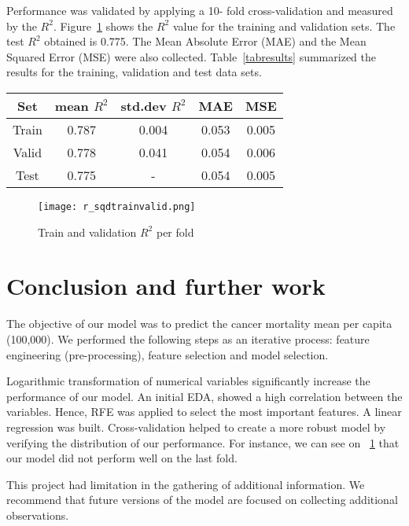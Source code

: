 \documentclass[twocolumn]{article}
\begin{document}
Performance was validated by applying a 10- fold cross-validation and measured by the $R^2$. Figure~\ref{fig:rsqrd_trainval} shows the $R^2$ value for the training and validation sets. The test $R^2$ obtained is 0.775. The Mean Absolute Error (MAE) and the Mean Squared Error (MSE) were also collected. Table~\ref{tabresults} summarized the results for the training, validation and test data sets.

\begin{center}\label{tabresults}
\begin{tabular}{ |c|c|c|c|c| } 
 \hline
 Set   &mean $R^2$ &std.dev $R^2$   & MAE   & MSE \\
 \hline
 Train      &0.787      & 0.004                     &0.053  &0.005 \\ 
 Valid &0.778      &0.041                      &0.054  & 0.006\\ 
 Test       & 0.775     &-                          &0.054  & 0.005\\ 
 \hline
\end{tabular}
\end{center}

\begin{figure}
    \centering
    \texttt{[image: r\_sqdtrainvalid.png]}
    \caption{Train and validation $R^2$ per fold}
    \label{fig:rsqrd_trainval}
\end{figure}

\section{Conclusion and further work}\label{secconclusion}

The objective of our model was to predict the cancer mortality mean per capita (100,000). We performed the following steps as an iterative process: feature engineering (pre-processing), feature selection and model selection. 

Logarithmic transformation of numerical variables significantly increase the performance of our model. An initial EDA, showed a high correlation between the variables. Hence, RFE was applied to select the most important features. A linear regression was built. Cross-validation helped to create a more robust model by verifying the distribution of our performance. For instance, we can see on ~\ref{fig:rsqrd_trainval} that our model did not perform well on the last fold. 

This project had limitation in the gathering of additional information. We recommend that future versions of the model are focused on collecting additional observations.
\end{document}
